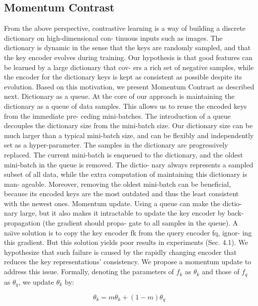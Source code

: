 \documentclass[10pt,twocolumn]{article}  %
\begin{document}
\subsection{Momentum Contrast}
From the above perspective, contrastive learning is a way
of building a discrete dictionary on high-dimensional con-
tinuous inputs such as images. The dictionary is dynamic in
the sense that the keys are randomly sampled, and that the
key encoder evolves during training. Our hypothesis is that
good features can be learned by a large dictionary that cov-
ers a rich set of negative samples, while the encoder for the
dictionary keys is kept as consistent as possible despite its
evolution. Based on this motivation, we present Momentum
Contrast as described next.
Dictionary as a queue. At the core of our approach is
maintaining the dictionary as a queue of data samples. This
allows us to reuse the encoded keys from the immediate pre-
ceding mini-batches. The introduction of a queue decouples
the dictionary size from the mini-batch size. Our dictionary
size can be much larger than a typical mini-batch size, and
can be flexibly and independently set as a hyper-parameter.
The samples in the dictionary are progressively replaced.
The current mini-batch is enqueued to the dictionary, and
the oldest mini-batch in the queue is removed. The dictio-
nary always represents a sampled subset of all data, while
the extra computation of maintaining this dictionary is man-
ageable. Moreover, removing the oldest mini-batch can be
beneficial, because its encoded keys are the most outdated
and thus the least consistent with the newest ones.
Momentum update. Using a queue can make the dictio-
nary large, but it also makes it intractable to update the key
encoder by back-propagation (the gradient should propa-
gate to all samples in the queue). A na\"{\i}ve solution is to
copy the key encoder fk from the query encoder fq, ignor-
ing this gradient. But this solution yields poor results in
experiments (Sec. 4.1). We hypothesize that such failure
is caused by the rapidly changing encoder that reduces the
key representations' consistency. We propose a momentum
update to address this issue.
Formally, denoting the parameters of $f_k$ as $\theta_k$ and those
of $f_q$ as $\theta_q$, we update $\theta_k$ by:

\begin{equation}
    \theta_k = m \theta_k + (1-m) \theta_q
    \label{eq:equation2}
\end{equation}
\end{document}
